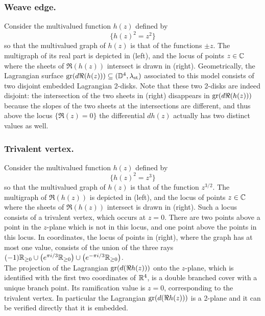 \subsubsection{Weave edge.}\label{sssec:weave_edge_model} Consider the multivalued function $h(z)$ defined by
\begin{equation}
\boxed{\{h(z)^2=z^2\}}
\end{equation}
\noindent so that the multivalued graph of $h(z)$ is that of the functions $\pm z$. The multigraph of its real part is depicted in  (left), and the locus of points $z\in\mathbb{C}$ where the sheets of $\Re(h(z))$ intersect is drawn in  (right). Geometrically, the Lagrangian surface $\operatorname{gr}(d\Re(h(z)))\subseteq(\mathbb{D}^4,\lambda_{\text{st}})$ associated to this model consists of two disjoint embedded Lagrangian 2-disks. Note that these two 2-disks are indeed disjoint: the intersection of the two sheets in  (right) disappears in $\operatorname{gr}(d\Re(h(z)))$ because the slopes of the two sheets at the intersections are different, and thus above the locus $\{\Re(z)=0\}$ the differential $dh(z)$ actually has two distinct values as well.

\subsubsection{Trivalent vertex.}\label{sssec:trivalent_model} Consider the multivalued function $h(z)$ defined by
\begin{equation}
\boxed{\{h(z)^2=z^3\}}
\end{equation}
\noindent so that the multivalued graph of $h(z)$ is that of the function $z^{3/2}$. The multigraph of $\Re(h(z))$ is depicted in  (left), and the locus of points $z\in\mathbb{C}$ where the sheets of $\Re(h(z))$ intersect is drawn in  (right). Such a locus consists of a trivalent vertex, which occurs at $z=0$. There are two points above a point in the $z$-plane which is not in this locus, and one point above the points in this locus. In coordinates, the locus of points in  (right), where the graph has at most one value, consists of the union of the three rays $(-1)\mathbb{R}_{\geq0}\cup \left(e^{\pi i/3}\mathbb{R}_{\geq0}\right)\cup \left(e^{-\pi i/3}\mathbb{R}_{\geq0}\right)$.\\

\noindent The projection of the Lagrangian $\operatorname{gr}(d(\Re h(z)))$ onto the $z$-plane, which is identified with the first two coordinates of $\mathbb{R}^4$, is a double branched cover with a unique branch point. Its ramification value is $z=0$, corresponding to the trivalent vertex. In particular the Lagrangian $\operatorname{gr}(d(\Re h(z) ))$ is a 2-plane and it can be verified directly that it is embedded.

